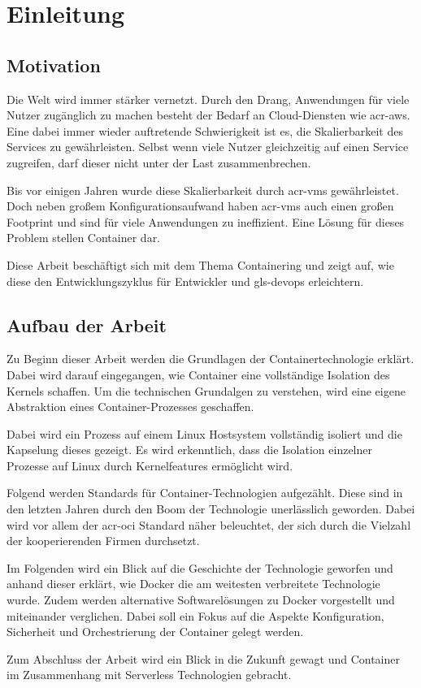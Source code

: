 \chapter{Einleitung}
\label{chap:einleitung}

\section{Motivation}
\label{sec:motivation}
Die Welt wird immer stärker vernetzt. Durch den Drang, Anwendungen für viele Nutzer zugänglich zu machen besteht der Bedarf an Cloud-Diensten wie \gls{acr-aws}.
Eine dabei immer wieder auftretende Schwierigkeit ist es, die Skalierbarkeit des Services zu gewährleisten. Selbst wenn viele Nutzer gleichzeitig auf einen Service zugreifen, darf dieser nicht unter der Last zusammenbrechen.

Bis vor einigen Jahren wurde diese Skalierbarkeit durch \glspl{acr-vm} gewährleistet. Doch neben großem Konfigurationsaufwand haben \glspl{acr-vm} auch einen großen Footprint und sind für viele  Anwendungen zu ineffizient. Eine Lösung für dieses Problem stellen Container dar.

Diese Arbeit beschäftigt sich mit dem Thema Containering und zeigt auf, wie diese den Entwicklungszyklus für Entwickler und \gls{gls-devops} erleichtern.

\section{Aufbau der Arbeit}
\label{sec:aufbau}
Zu Beginn dieser Arbeit werden die Grundlagen der Containertechnologie erklärt. Dabei wird darauf eingegangen, wie Container eine vollständige Isolation des Kernels schaffen. Um die technischen Grundalgen zu verstehen, wird eine eigene Abstraktion eines Container-Prozesses geschaffen.

Dabei wird ein Prozess auf einem Linux Hostsystem vollständig isoliert und die Kapselung dieses gezeigt. Es wird erkenntlich, dass die Isolation einzelner Prozesse auf Linux durch Kernelfeatures ermöglicht wird.

Folgend werden Standards für Container-Technologien aufgezählt. Diese sind in den letzten Jahren durch den Boom der Technologie unerlässlich geworden. Dabei wird vor allem der \gls{acr-oci} Standard näher beleuchtet, der sich durch die Vielzahl der kooperierenden Firmen durchsetzt.

Im Folgenden wird ein Blick auf die Geschichte der Technologie geworfen und anhand dieser erklärt, wie Docker die am weitesten verbreitete Technologie wurde. Zudem werden alternative Softwarelösungen zu Docker vorgestellt und miteinander verglichen. Dabei soll ein Fokus auf die Aspekte Konfiguration, Sicherheit und Orchestrierung der Container gelegt werden.

Zum Abschluss der Arbeit wird ein Blick in die Zukunft gewagt und Container im Zusammenhang mit Serverless Technologien gebracht.